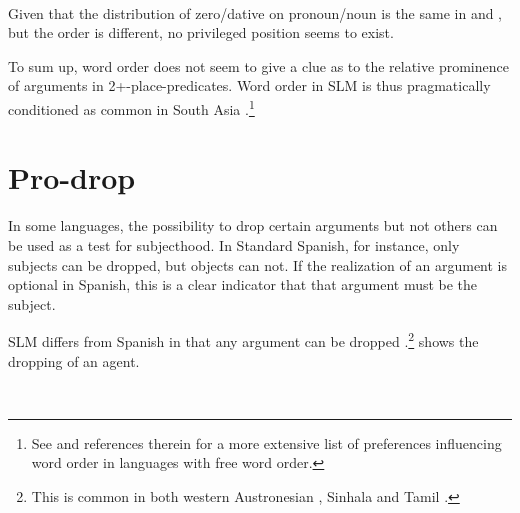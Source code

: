  \\

Given that the distribution of zero/dative on pronoun/noun  is the same in  and , but the order is different, no privileged position seems to exist.

To sum up, word order does not seem to give a clue as to the relative prominence of arguments in 2+-place-predicates. Word order in SLM is thus pragmatically conditioned as common in South Asia \citep{Bickel2004syntexp}.\footnote{See \citet[62]{Bayer2004} and references therein for a more extensive list of preferences influencing word order in languages with free word order.}







\section{Pro-drop}\label{sec:grel:Pro-drop}
In some languages, the possibility to drop certain arguments but not others can be used as a test for subjecthood. In Standard Spanish, for instance, only subjects can be dropped, but objects can not. If the realization of an argument is optional in Spanish, this is a clear indicator that that argument must be the subject.

SLM differs from Spanish in that any argument can be dropped \citep{SmithEtAl2004}.\footnote{This is common in both western Austronesian \citep[171]{Himmelmann2005typochar}, Sinhala \citep[813]{Gair2003} and Tamil \citep[367]{Lehmann1989}.}  shows the dropping of an agent.

 \\

